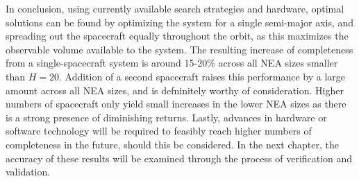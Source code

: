 In conclusion, using currently available search strategies and hardware, optimal solutions can be found by optimizing the system for a single semi-major axis, and spreading out the spacecraft equally throughout the orbit, as this maximizes the observable volume available to the system. The resulting increase of completeness from a single-spacecraft system is around 15-20\% across all NEA sizes smaller than $H=20$. Addition of a second spacecraft raises this performance by a large amount across all NEA sizes, and is defninitely worthy of consideration. Higher numbers of spacecraft only yield small increases in the lower NEA sizes as there is a strong presence of diminishing returns. Lastly, advances in hardware or software technology will be required to feasibly reach higher numbers of completeness in the future, should this be considered. In the next chapter, the accuracy of these results will be examined through the process of verification and validation.
